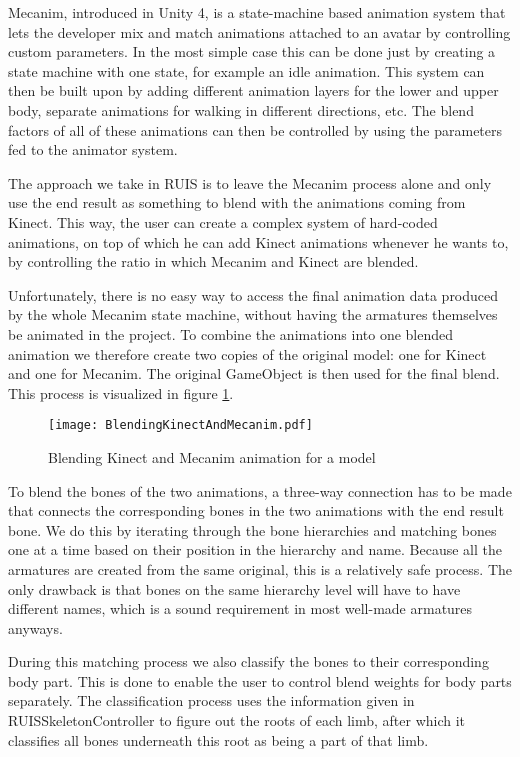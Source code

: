 \documentclass[12pt,a4paper,oneside,pdftex]{report}
\begin{document}
Mecanim, introduced in Unity 4, is a state-machine based animation system that lets the developer mix and match animations attached to an avatar by controlling custom parameters. In the most simple case this can be done just by creating a state machine with one state, for example an idle animation. This system can then be built upon by adding different animation layers for the lower and upper body, separate animations for walking in different directions, etc. The blend factors of all of these animations can then be controlled by using the parameters fed to the animator system. 

The approach we take in RUIS is to leave the Mecanim process alone and only use the end result as something to blend with the animations coming from Kinect. This way, the user can create a complex system of hard-coded animations, on top of which he can add Kinect animations whenever he wants to, by controlling the ratio in which Mecanim and Kinect are blended.

Unfortunately, there is no easy way to access the final animation data produced by the whole Mecanim state machine, without having the armatures themselves be animated in the project. To combine the animations into one blended animation we therefore create two copies of the original model: one for Kinect and one for Mecanim. The original GameObject is then used for the final blend. This process is visualized in figure \ref{fig:blendingkinectandmecanim}.

\begin{figure}[h]
\centering
\texttt{[image: BlendingKinectAndMecanim.pdf]}
\caption{Blending Kinect and Mecanim animation for a model}
\label{fig:blendingkinectandmecanim}
\end{figure}

To blend the bones of the two animations, a three-way connection has to be made that connects the corresponding bones in the two animations with the end result bone. We do this by iterating through the bone hierarchies and matching bones one at a time based on their position in the hierarchy and name. Because all the armatures are created from the same original, this is a relatively safe process. The only drawback is that bones on the same hierarchy level will have to have different names, which is a sound requirement in most well-made armatures anyways. 

During this matching process we also classify the bones to their corresponding body part. This is done to enable the user to control blend weights for body parts separately. The classification process uses the information given in RUISSkeletonController to figure out the roots of each limb, after which it classifies all bones underneath this root as being a part of that limb. 
\end{document}
